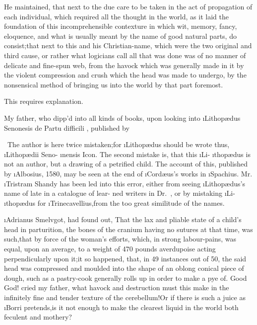 \documentclass[twoside]{article}
\begin{document}
He maintained, that next to the due care to be taken in the act
of propagation of each individual, which required all the thought
in the world, as it laid the foundation of this incomprehensible
contexture in which wit, memory, fancy, eloquence, and what is
usually meant by the name of good natural parts, do
consist;\tsk that next to this and his Christian-name, which were
the two original and
third cause, or rather what logicians
call 
all that was done was of no manner of 
delicate and fine-spun web, from the ha\-vock
which was generally made in it by
the violent compression and crush
which the head was made to undergo, by the nonsensical method of
bringing us into the world by that part foremost.

\tsh This requires explanation.

My father, who dipp’d into all kinds of books, upon looking into \i{Lithopædus
Senonesis de Partu difficili} \fnast, published by\break
{}

\vfill

\bgroup\fontsize{8}{11}\selectfont\indent\fnast\ 
The author is here twice mistaken;\tsh for\break
\i{Lithopædus} should be wrote thus, \i{Lithopædii Seno}-\break
\i{nensis Icon}. The second mistake is, that this \i{Li}-\break
\i{thopædus} is not an author, but a drawing of a\break
petrified child. The account of this, published\break
by \i{Albosius}, 1580, may be seen at the end of\break
\i{Cordæus}’s works in \i{Spachius}. Mr.\,\i{Tristram Shandy}\break
has been led into this error, either from seeing\break
\i{Lithopædus}’s name of late in a catalogue of lear-\break
ned writers in \hbox{Dr. \tsh}, or by mistaking \i{Li}-\break
\i{thopædus} for \i{Trinecavellius},\tsk from the too great\break
similitude of the names.\par\egroup

\vfill
\newpage\noindent
\i{Adrianus Smelvgot}, had found out, That\break
the lax and pliable state of a child’s\break
head in parturition, the bones of the\break
cranium having no sutures at that time,\break
was such,\tsk that by force of the woman’s\break
efforts, which, in strong labour-pains,\break
was equal, upon an average, to a
weight of 470 pounds averdupoise acting perpendicularly upon it;\tsk it so happened,
that, in 49 instances out of 50, the said head was compressed and moulded into the
shape of an oblong conical piece of dough, such as a pastry-cook generally rolls up
in order to make a pye of.\tsh\break
Good God!  cried my father, what ha\-vock and destruction
must this make in the infinitely fine and tender texture of the cerebellum!\tsk Or if
there is such a juice as \i{Borri} pretends,\tsk is it not enough to make the
clearest liquid in the world both feculent and
mothery?
\end{document}
